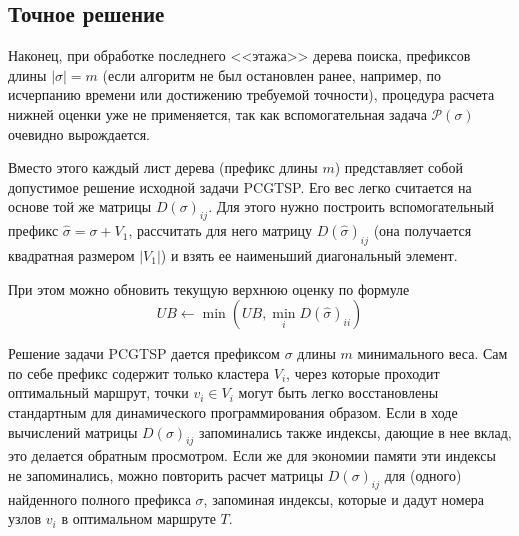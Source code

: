 
\subsection{Точное решение}
\label{sec:pgstcp.solution}

Наконец,
при обработке последнего
<<этажа>> дерева поиска,
префиксов длины
$|\sigma|=m$
(если алгоритм не был остановлен ранее,
например, по исчерпанию времени или
достижению требуемой точности),
процедура расчета нижней оценки уже не применяется,
так как вспомогательная задача
$\mathcal P(\sigma)$
очевидно вырождается.

Вместо этого каждый лист дерева
(префикс длины $m$)
представляет собой допустимое решение
исходной задачи PCGTSP.
Его вес легко считается на основе той же матрицы
$D(\sigma)_{ij}$.
Для этого нужно построить
вспомогательный префикс
$\hat \sigma = \sigma + V_1$,
рассчитать для него матрицу
$D(\hat \sigma)_{ij}$
(она получается квадратная размером $|V_1|$)
и взять ее наименьший диагональный элемент.

При этом можно обновить текущую верхнюю оценку
по формуле
$$
UB \gets \min(UB, \min_i D(\hat \sigma)_{ii})
$$

Решение задачи PCGTSP дается префиксом $\sigma$
длины $m$ минимального веса.
Сам по себе префикс содержит только кластера $V_i$,
через которые проходит оптимальный маршрут,
точки $v_i \in V_i$
могут быть легко восстановлены стандартным
для динамического программирования образом.
Если в ходе вычислений матрицы
$D(\sigma)_{ij}$
запоминались также индексы,
дающие в нее вклад,
это делается обратным просмотром.
Если же для экономии памяти
эти индексы не запоминались,
можно повторить расчет матрицы
$D(\sigma)_{ij}$
для (одного) найденного полного префикса $\sigma$,
запоминая индексы,
которые и дадут номера узлов
$v_i$
в оптимальном маршруте $T$.
